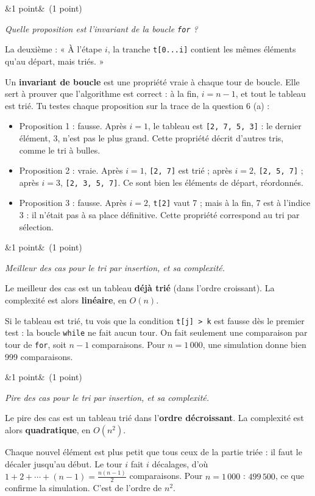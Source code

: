 \documentclass[11pt, a4paper]{exam}
\newcommand{\code}[1]{\texttt{#1}}
\newcommand{\Q}[3]{\par\needspace{5\baselineskip}\bigskip\noindent{\large\bfseries Question #1}\ifx&#2&\else\ \textnormal{(#2)}\fi\par\nopagebreak\smallskip\noindent\textit{#3}\par\nopagebreak\smallskip}
\begin{document}
\Q{6 (b)}{1 point}{Quelle proposition est l'invariant de la boucle \code{for} ?}
\begin{reponse}
La deuxième : « À l'étape $i$, la tranche \code{t[0...i]} contient les mêmes éléments qu'au départ, mais triés. »
\end{reponse}
Un \textbf{invariant de boucle} est une propriété vraie à chaque tour de boucle. Elle sert à prouver que l'algorithme est correct : à la fin, $i = n - 1$, et tout le tableau est trié. Tu testes chaque proposition sur la trace de la question 6 (a) :
\begin{itemize}
\item Proposition 1 : fausse. Après $i = 1$, le tableau est \code{[2, 7, 5, 3]} : le dernier élément, 3, n'est pas le plus grand. Cette propriété décrit d'autres tris, comme le tri à bulles.
\item Proposition 2 : vraie. Après $i = 1$, \code{[2, 7]} est trié ; après $i = 2$, \code{[2, 5, 7]} ; après $i = 3$, \code{[2, 3, 5, 7]}. Ce sont bien les éléments de départ, réordonnés.
\item Proposition 3 : fausse. Après $i = 2$, \code{t[2]} vaut 7 ; mais à la fin, 7 est à l'indice 3 : il n'était pas à sa place définitive. Cette propriété correspond au tri par sélection.
\end{itemize}

\Q{6 (c) i}{1 point}{Meilleur des cas pour le tri par insertion, et sa complexité.}
\begin{reponse}
Le meilleur des cas est un tableau \textbf{déjà trié} (dans l'ordre croissant). La complexité est alors \textbf{linéaire}, en $O(n)$.
\end{reponse}
Si le tableau est trié, tu vois que la condition \code{t[j] > k} est fausse dès le premier test : la boucle \code{while} ne fait aucun tour. On fait seulement une comparaison par tour de \code{for}, soit $n - 1$ comparaisons. Pour $n = 1\,000$, une simulation donne bien 999 comparaisons.

\Q{6 (c) ii}{1 point}{Pire des cas pour le tri par insertion, et sa complexité.}
\begin{reponse}
Le pire des cas est un tableau trié dans l'\textbf{ordre décroissant}. La complexité est alors \textbf{quadratique}, en $O(n^2)$.
\end{reponse}
Chaque nouvel élément est plus petit que tous ceux de la partie triée : il faut le décaler jusqu'au début. Le tour $i$ fait $i$ décalages, d'où $1 + 2 + \cdots + (n-1) = \frac{n(n-1)}{2}$ comparaisons. Pour $n = 1\,000$ : $499\,500$, ce que confirme la simulation. C'est de l'ordre de $n^2$.
\end{document}

